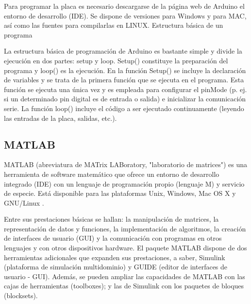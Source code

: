Para programar la placa es necesario descargarse de la página web de Arduino el entorno de desarrollo (IDE). Se dispone de versiones para Windows y para MAC, así como las fuentes para compilarlas en LINUX.
Estructura básica de un programa

La estructura básica de programación de Arduino es bastante simple y divide la ejecución en dos partes: setup y loop. Setup() constituye la preparación del programa y loop() es la ejecución. En la función Setup() se incluye la declaración de variables y se trata de la primera función que se ejecuta en el programa. Esta función se ejecuta una única vez y es empleada para configurar el pinMode (p. ej. si un determinado pin digital es de entrada o salida) e inicializar la comunicación serie. La función loop() incluye el código a ser ejecutado continuamente (leyendo las entradas de la placa, salidas, etc.). 

\subsection{MATLAB}
MATLAB (abreviatura de MATrix LABoratory, "laboratorio de matrices") es una herramienta de software matemático que ofrece un entorno de desarrollo integrado (IDE) con un lenguaje de programación propio (lenguaje M) y servicio de especie. Está disponible para las plataformas Unix, Windows, Mac OS X y GNU/Linux .

Entre sus prestaciones básicas se hallan: la manipulación de matrices, la representación de datos y funciones, la implementación de algoritmos, la creación de interfaces de usuario (GUI) y la comunicación con programas en otros lenguajes y con otros dispositivos hardware. El paquete MATLAB dispone de dos herramientas adicionales que expanden sus prestaciones, a saber, Simulink (plataforma de simulación multidominio) y GUIDE (editor de interfaces de usuario - GUI). Además, se pueden ampliar las capacidades de MATLAB con las cajas de herramientas (toolboxes); y las de Simulink con los paquetes de bloques (blocksets).
